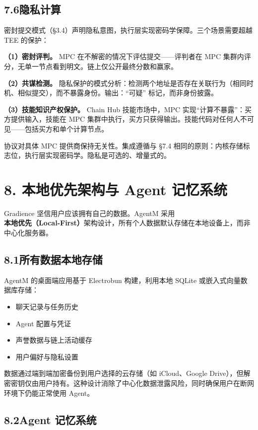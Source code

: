\documentclass[11pt,a4paper]{article}
\begin{document}
\subsection{7.6\quad 隐私计算}

密封提交模式（\S3.4）声明隐私意图，执行层实现密码学保障。三个场景需要超越 TEE 的保护：

\textbf{（1）密封评判。} MPC 在不解密的情况下评估提交——评判者在 MPC 集群内评分，无单一节点看到明文。链上仅公开最终分数和赢家。

\textbf{（2）共谋检测。} 隐私保护的模式分析：检测两个地址是否存在关联行为（相同时机、相似提交），而不暴露身份。输出：``可疑'' 标记，而非身份披露。

\textbf{（3）技能知识产权保护。} Chain Hub 技能市场中，MPC 实现``计算不暴露''：买方提供输入，技能在 MPC 集群中执行，买方只获得输出。技能代码对任何人不可见——包括买方和单个计算节点。

协议对具体 MPC 提供商保持无关性。集成遵循与 \S7.4 相同的原则：内核存储标志位，执行层实现密码学。隐私是可选的、增量式的。

\section{8. 本地优先架构与 Agent 记忆系统}

Gradience 坚信用户应该拥有自己的数据。AgentM 采用\textbf{本地优先（Local-First）}架构设计，所有个人数据默认存储在本地设备上，而非中心化服务器。

\subsection{8.1\quad 所有数据本地存储}

AgentM 的桌面端应用基于 Electrobun 构建，利用本地 SQLite 或嵌入式向量数据库存储：
\begin{itemize}[leftmargin=2em]
  \item 聊天记录与任务历史
  \item Agent 配置与凭证
  \item 声誉数据与链上活动缓存
  \item 用户偏好与隐私设置
\end{itemize}

数据通过端到端加密备份到用户选择的云存储（如 iCloud、Google Drive），但解密密钥仅由用户持有。这种设计消除了中心化数据泄露风险，同时确保用户在断网环境下仍能正常使用 Agent。

\subsection{8.2\quad Agent 记忆系统}
\end{document}
